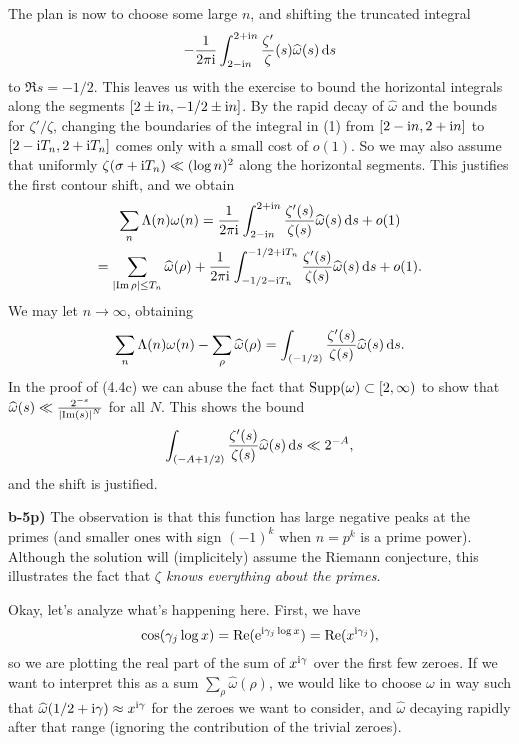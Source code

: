 \documentclass[a4paper,11pt]{article}
\begin{document}
    The plan is now to choose some large $n$, and 
    shifting the truncated integral 
    \begin{equation}
        -\frac{1}{2 \pi \mathrm i} \int_{2-\mathrm i n}^{2+ \mathrm i n} \frac{\zeta'}{\zeta}(s) \widehat \omega(s)
        \mathrm{\,d} s
    \end{equation}
    to $\Re s = -1/2$. This leaves us with the exercise to bound the horizontal
    integrals along the segments $[2\pm \mathrm i n, -1/2 \pm \mathrm i n]$. By the rapid decay
    of $\hat \omega$ and the bounds for $\zeta'/\zeta$, changing the boundaries
    of the integral in (1) from $[2-\mathrm i n, 2 + \mathrm i n]$ to $[2 - \mathrm i T_n, 2 +
    \mathrm i T_n]$ comes only with a small cost of $o(1)$. So we may also assume that
    uniformly $\zeta(\sigma + \mathrm i T_n) \ll (\log n)^2$ along the horizontal segments. 
    This justifies the first contour shift, and we obtain
    \begin{multline*}
        \sum_n \Lambda(n) \omega(n) = \frac{1}{2 \pi \mathrm i} \int_{2- \mathrm i n}^{2 + \mathrm i n} 
        \frac{\zeta'(s)}{\zeta(s)} \widehat \omega(s) \mathrm{\,d} s + o(1) \\
        = \sum_{\left\lvert \operatorname{Im} \rho \right\rvert \leq T_n} \widehat \omega(\rho)
        + \frac{1}{2 \pi \mathrm i} \int_{-1/2 - \mathrm i T_n}^{-1/2 + \mathrm i T_n}
        \frac{\zeta'(s)}{\zeta(s)} \widehat \omega(s) \mathrm{\,d} s + o(1).
    \end{multline*}
    We may let $n \to \infty$, obtaining 
    \[
        \sum_n \Lambda(n) \omega(n) - \sum_\rho \widehat \omega(\rho)
         = \int_{(-1/2)}  \frac{\zeta'(s)}{\zeta(s)} \widehat \omega(s) \mathrm{\,d} s.
    \]
    In the proof of (4.4c) we can abuse the fact that $\operatorname{Supp}(\omega) \subset
    [2, \infty)$ to show that $\widehat \omega(s) \ll \frac{2^{-s}}{\left\lvert \operatorname{Im}(s) \right\rvert^N}$
    for all $N$. This shows the bound
    \[
        \int_{(-A+1/2)}  \frac{\zeta'(s)}{\zeta(s)} \widehat \omega(s) \mathrm{\,d} s
        \ll 2^{-A},
    \]
    and the shift is justified.

\textbf{b-5p)}
The observation is that this function has large negative peaks at the primes
(and smaller ones with sign $(-1)^k$ when $n=p^k$ is a prime power). Although 
the solution will (implicitely) assume the Riemann conjecture, this illustrates
the fact that \textit{$\zeta$ knows everything about the primes.}

Okay, let's analyze what's happening here. First, we have 
\[
    \cos(\gamma_j \log x) = \operatorname{Re}(\mathrm e^{\mathrm i \gamma_j \log x}) = \operatorname{Re}(x^{\mathrm i \gamma_j}),
\]
so we are plotting the real part of the sum of $x^{\mathrm i \gamma}$ over the first few
zeroes. If we want to interpret this as a sum $\sum_\rho \hat \omega(\rho)$, 
we would like to choose $\omega$ in way such that $\widehat \omega(1/2 + \mathrm i \gamma)
\approx x^{\mathrm i \gamma}$ for the zeroes we want to consider, and $\hat \omega$ 
decaying rapidly after that range (ignoring the contribution of the trivial zeroes).
\end{document}

